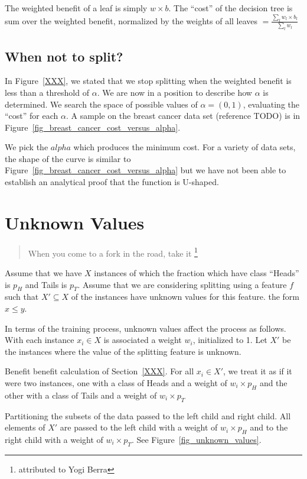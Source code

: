The weighted benefit of a leaf is simply \(w \times b\).
The ``cost'' of the decision tree is sum over the 
weighted benefit, normalized by the weights of all leaves 
\(= \frac{\sum_l w_l \times b_l}{\sum_l w_l}\)

\subsection{When not to split?}

In Figure~\ref{XXX}, we stated that we stop splitting when the weighted benefit
is less than a threshold of \(\alpha\). We are now in a position to describe how
\(\alpha\) is determined. We search the space of possible values of \(\alpha =
(0, 1)\), evaluating the ``cost'' for each \(\alpha\). A sample on the breast
cancer data set (reference TODO) is in
Figure~\ref{fig_breast_cancer_cost_versus_alpha}.

We pick the \(alpha\) which produces the minimum cost. For a variety of data
sets, the shape of the curve is similar to 
Figure~\ref{fig_breast_cancer_cost_versus_alpha} but we have not been able to
establish an analytical proof that the function is U-shaped.

\section{Unknown Values}
\label{unknowns}

\begin{quote}
When you come to a fork in the road, take it \footnote{attributed to Yogi Berra}
\end{quote}
Assume that we have \(X\) instances of which the fraction which have class
``Heads'' is \(p_H\) and Tails is \(p_T\).
Assume that we are considering splitting using
a feature \(f\) such that \(X' \subseteq X\) of the instances have unknown
values for this feature. 
the form \(x \leq y\). 

In terms of the training process, unknown values affect the process 
as follows.  With each instance \(x_i \in X\) is associated a weight \(w_i\),
initialized to 1. Let \(X'\) be the instances where the value of the splitting feature is unknown.

\be
\item Benefit benefit calculation of Section~\ref{XXX}. 
For all \(x_i \in X'\), we treat it as if it were two instances, one with a class of Heads and a weight of \(w_i \times p_H\) and the other with a class of Tails and a weight of \(w_i \times p_T\)
\item Partitioning the subsets of the data passed to the left child and right child.  All elements of \(X'\) are passed to the left child with a weight of \(w_i \times p_H\) and to the right child with a weight of \(w_i \times p_T\).  See Figure~\ref{fig_unknown_values}.
\ee

